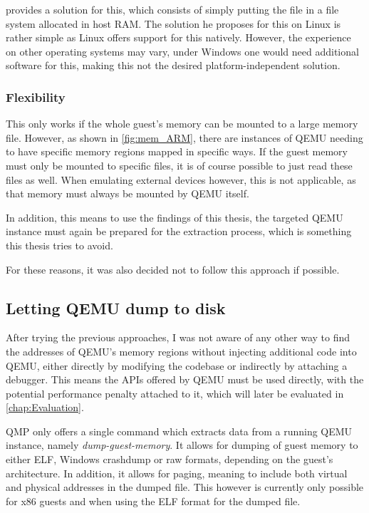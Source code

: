  provides a solution for this,
which consists of simply putting the file in a file system allocated in host RAM.
The solution he proposes for this on Linux is rather simple as Linux offers support for this natively.
However, the experience on other operating systems may vary, under Windows one would need additional software for this,
making this not the desired platform-independent solution.

\subsubsection{Flexibility}
This only works if the whole guest's memory can be mounted to a large memory file.
However, as shown in \autoref{fig:mem_ARM},
there are instances of QEMU needing to have specific memory regions mapped in specific ways.
If the guest memory must only be mounted to specific files,
it is of course possible to just read these files as well.
When emulating external devices however,
this is not applicable, as that memory must always be mounted by QEMU itself.

In addition, this means to use the findings of this thesis,
the targeted QEMU instance must again be prepared for the extraction process,
which is something this thesis tries to avoid.

For these reasons, it was also decided not to follow this approach if possible.

\subsection{Letting QEMU dump to disk}\label{sec:resignation}
After trying the previous approaches,
I was not aware of any other way to find the addresses of QEMU's memory regions
without injecting additional code into QEMU,
either directly by modifying the codebase or indirectly by attaching a debugger.
This means the APIs offered by QEMU must be used directly,
with the potential performance penalty attached to it,
which will later be evaluated in \autoref{chap:Evaluation}.

QMP only offers a single command which extracts data from a running QEMU instance,
namely \emph{dump-guest-memory}.
It allows for dumping of guest memory to either ELF, Windows crashdump or raw formats,
depending on the guest's architecture.
In addition, it allows for paging, meaning to include both virtual and physical addresses in the dumped file.
This however is currently only possible for x86 guests and when using the ELF format for the dumped file.

